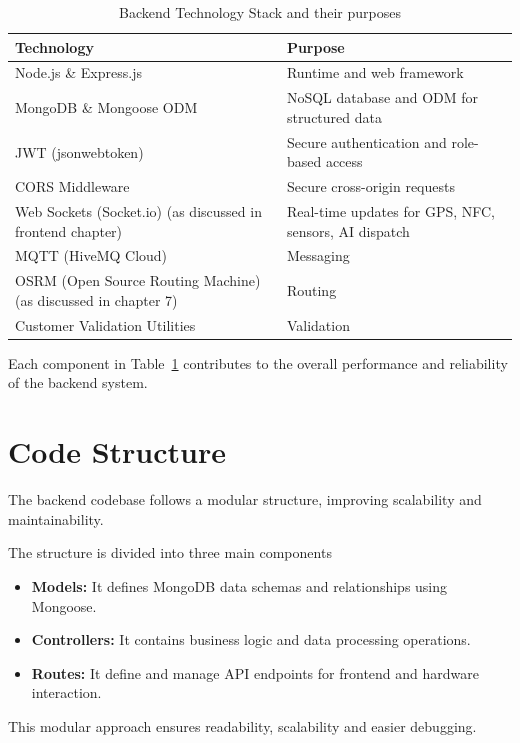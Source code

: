 \begin{table}[H]
    \centering
    \caption{Backend Technology Stack and their purposes}
    \label{tab:5.1}
    \begin{tabular}{>{\raggedright\arraybackslash}p{5cm}>{\raggedright\arraybackslash}p{9cm}}
        \toprule
        \textbf{Technology} & \textbf{Purpose} \\
        \midrule
        Node.js \& Express.js & Runtime and web framework \\
        MongoDB \& Mongoose ODM & NoSQL database and ODM for structured data \\
        JWT (jsonwebtoken) & Secure authentication and role-based access \\
        CORS Middleware & Secure cross-origin requests \\
        Web Sockets (Socket.io) (as discussed in frontend chapter) & Real-time updates for GPS, NFC, sensors, AI dispatch \\
        MQTT (HiveMQ Cloud) & Messaging \\
        OSRM (Open Source Routing Machine)(as discussed in chapter 7) & Routing \\
        Customer Validation Utilities & Validation \\
        \bottomrule
    \end{tabular}
\end{table}

Each component in Table~\ref{tab:5.1} contributes to the overall performance and reliability of the backend system.

\section{Code Structure}
The backend codebase follows a modular structure, improving scalability and maintainability.

The structure is divided into three main components
\begin{itemize}
    \item \textbf{Models:} It defines MongoDB data schemas and relationships using Mongoose.
    \item \textbf{Controllers:} It contains business logic and data processing operations.
    \item \textbf{Routes:} It define and manage API endpoints for frontend and hardware interaction.
\end{itemize}
This modular approach ensures readability, scalability and easier debugging.

